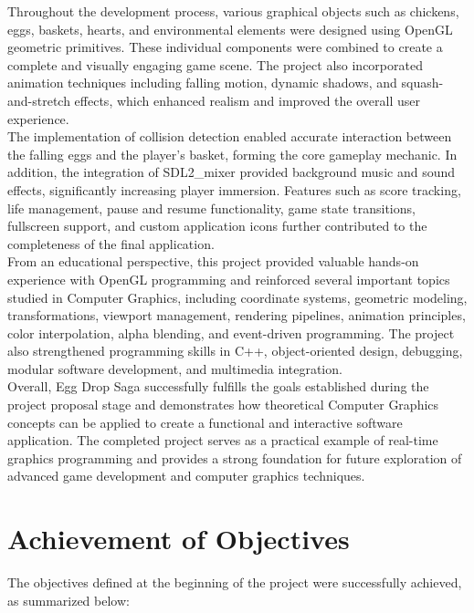 \documentclass[12pt,a4paper]{report}
\begin{document}
Throughout the development process, various graphical objects such as chickens, eggs, baskets, hearts, and environmental elements were designed using OpenGL geometric primitives. These individual components were combined to create a complete and visually engaging game scene. The project also incorporated animation techniques including falling motion, dynamic shadows, and squash-and-stretch effects, which enhanced realism and improved the overall user experience.\\

The implementation of collision detection enabled accurate interaction between the falling eggs and the player's basket, forming the core gameplay mechanic. In addition, the integration of SDL2\_mixer provided background music and sound effects, significantly increasing player immersion. Features such as score tracking, life management, pause and resume functionality, game state transitions, fullscreen support, and custom application icons further contributed to the completeness of the final application.\\

From an educational perspective, this project provided valuable hands-on experience with OpenGL programming and reinforced several important topics studied in Computer Graphics, including coordinate systems, geometric modeling, transformations, viewport management, rendering pipelines, animation principles, color interpolation, alpha blending, and event-driven programming. The project also strengthened programming skills in C++, object-oriented design, debugging, modular software development, and multimedia integration.\\

Overall, Egg Drop Saga successfully fulfills the goals established during the project proposal stage and demonstrates how theoretical Computer Graphics concepts can be applied to create a functional and interactive software application. The completed project serves as a practical example of real-time graphics programming and provides a strong foundation for future exploration of advanced game development and computer graphics techniques.\\

\section{Achievement of Objectives}

The objectives defined at the beginning of the project were successfully achieved, as summarized below:
\end{document}
